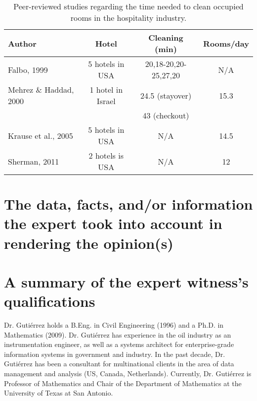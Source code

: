 \documentclass[12pt,reqno]{amsart}
\begin{document}
\begin{table}
	\begin{center}
		\begin{tabular}{||l |c |c |c||} 
		 \hline
		 Author 														& Hotel 						& Cleaning (min) 					& Rooms/day \\ [0.5ex] 
		 \hline\hline
		 Falbo, 1999 \cite{falbo1999room} 	& 5 hotels in USA 	& 20,18-20,20-25,27,20 	& N/A \\ 
		 \hline
		 Mehrez \& Haddad, 2000 \cite{mehrez2000work}	& 1 hotel in Israel & 24.5 (stayover)		& 15.3 \\
																						&										& 43 (checkout)			&				\\
		 \hline
		 Krause et al., 2005 \cite{krause2005physical} & 5 hotels in USA & N/A 											& 14.5 \\
		 \hline
		 Sherman, 2011 \cite{sherman2011beyond} & 2 hotels is USA & N/A & 12 \\
		 \hline
		\end{tabular}
	\end{center}
	\caption{Peer-reviewed studies regarding the time needed to clean occupied rooms in the hospitality industry.}
	\label{tab:Hotels}
\end{table}
		
	
	\section{The data, facts, and/or information the expert took into account in rendering the opinion(s)}
	
	

	
	\section{A summary of the expert witness’s qualifications}
	Dr. Gutiérrez holds a B.Eng. in Civil Engineering (1996) and a Ph.D. in Mathematics (2009). Dr. Gutiérrez has experience in the oil industry as an instrumentation engineer, as well as a systems architect for enterprise-grade information systems in government and industry. In the past decade, Dr. Gutiérrez has been a consultant for multinational clients in the area of data management and analysis (US, Canada, Netherlands).  Currently, Dr. Gutiérrez is Professor of Mathematics and Chair of the Department of Mathematics at the University of Texas at San Antonio.  
	
\end{document}
